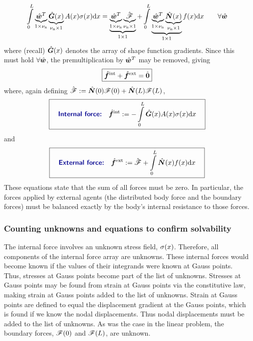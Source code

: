 \begin{equation}
 \int\limits_0^L \underbrace{\hat{\bm{w}}^T}_{1\times{\nu_\text{n}}}\underbrace{\hat{\bm{G}}(x)}_{{\nu_\text{n}}\times1} A(x) {\sigma}(x) \mathrm{d} x 
= 
\underbrace{\underbrace{\hat{\bm{w}}^T}_{1\times{\nu_\text{n}}}\underbrace{\hat{\bm{\mathscr{F}}}}_{{\nu_\text{n}}\times1}}_{1\times1}
+  \int\limits_0^L \underbrace{\underbrace{\hat{\bm{w}}^T}_{1\times{\nu_\text{n}}}\underbrace{\hat{\bm{N}}(x)}_{{\nu_\text{n}}\times1}}_{1\times1}f(x)
\mathrm{d} x
 \qquad\forall\hat{\bm{w}}
\label{eq:nonLinearBarWeakFormWithForcesArrayForm}
\end{equation}
where (recall) $\hat{\bm{G}}(x)$ denotes the array of shape function gradients.
Since this must hold $\forall\hat{\bm{w}}$, the premultiplication by $\hat{\bm{w}}^T$ may be removed, giving
\begin{equation}
 \boxed{\hat{\bm{f}}^\text{int} +  \hat{\bm{f}}^\text{ext} = \hat{\bm{0}}}
\label{eq:nonLinearBarWeakFormWithForcesDiscr}
\end{equation}
%
where, again defining 
$\hat{\bm{\mathscr{F}}}
:=
 \hat{\bm{N}}(0)\mathscr{F}(0)
+ \hat{\bm{N}}(L)\mathscr{F}(L)$, 
\begin{equation}
\boxit{\quad
\text{\Defn{Internal force:}}\quad
  \Array{f}^\text{int}\definedEqual -\int\limits_0^L \gradNBFa(x) A(x) \sig(x) \dd x
\quad}
\label{eq:nonlinearBarInternalForce}
\end{equation}
and
\begin{equation}
\boxit{\quad
\text{\Defn{External force:}}\quad
  \Array{f}^\text{ext}
\definedEqual
\Array{\tractionForce} +  \int\limits_0^L \NBFa(x)f(x)\dd x
\quad}
\label{eq:nonlinearBarExternalForce}
\end{equation}
These equations state that the sum of all forces must be zero. In particular, the forces applied by external agents (the distributed body force and the boundary forces) must be balanced exactly by the body's internal resistance to those forces.



\subsubsection{Counting unknowns and equations to confirm solvability}
The internal force involves an unknown stress field, ${\sigma}(x)$. Therefore, all components of the internal force array are unknowns.  These internal forces would become known if the values of their integrands were known at Gauss points. Thus, stresses at Gauss points become part of the list of unknowns. Stresses at Gauss points may be found from strain at Gauss points via the constitutive law, making strain at Gauss  points added to the list of unknowns. Strain at Gauss points are defined to equal the displacement gradient at the Gauss points, which is found if we know the nodal displacements. Thus nodal displacements must be added to the list of unknowns.  As was the case in the linear problem, the boundary forces, $\mathscr{F}(0)$ and $\mathscr{F}(L)$, are unknown. 

